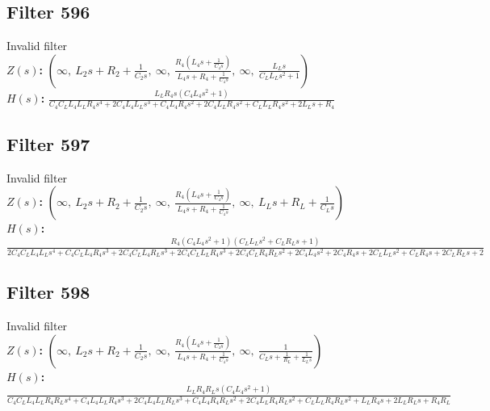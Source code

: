 \documentclass{article}
\begin{document}
\subsection*{Filter 596}
Invalid filter \\ 
\textbf{$Z(s)$:} $\left( \infty, \  L_{2} s + R_{2} + \frac{1}{C_{2} s}, \  \infty, \  \frac{R_{4} \left(L_{4} s + \frac{1}{C_{4} s}\right)}{L_{4} s + R_{4} + \frac{1}{C_{4} s}}, \  \infty, \  \frac{L_{L} s}{C_{L} L_{L} s^{2} + 1}\right)$ \\ 
\textbf{$H(s)$:} $\frac{L_{L} R_{4} s \left(C_{4} L_{4} s^{2} + 1\right)}{C_{4} C_{L} L_{4} L_{L} R_{4} s^{4} + 2 C_{4} L_{4} L_{L} s^{3} + C_{4} L_{4} R_{4} s^{2} + 2 C_{4} L_{L} R_{4} s^{2} + C_{L} L_{L} R_{4} s^{2} + 2 L_{L} s + R_{4}}$ \\ 
\subsection*{Filter 597}
Invalid filter \\ 
\textbf{$Z(s)$:} $\left( \infty, \  L_{2} s + R_{2} + \frac{1}{C_{2} s}, \  \infty, \  \frac{R_{4} \left(L_{4} s + \frac{1}{C_{4} s}\right)}{L_{4} s + R_{4} + \frac{1}{C_{4} s}}, \  \infty, \  L_{L} s + R_{L} + \frac{1}{C_{L} s}\right)$ \\ 
\textbf{$H(s)$:} $\frac{R_{4} \left(C_{4} L_{4} s^{2} + 1\right) \left(C_{L} L_{L} s^{2} + C_{L} R_{L} s + 1\right)}{2 C_{4} C_{L} L_{4} L_{L} s^{4} + C_{4} C_{L} L_{4} R_{4} s^{3} + 2 C_{4} C_{L} L_{4} R_{L} s^{3} + 2 C_{4} C_{L} L_{L} R_{4} s^{3} + 2 C_{4} C_{L} R_{4} R_{L} s^{2} + 2 C_{4} L_{4} s^{2} + 2 C_{4} R_{4} s + 2 C_{L} L_{L} s^{2} + C_{L} R_{4} s + 2 C_{L} R_{L} s + 2}$ \\ 
\subsection*{Filter 598}
Invalid filter \\ 
\textbf{$Z(s)$:} $\left( \infty, \  L_{2} s + R_{2} + \frac{1}{C_{2} s}, \  \infty, \  \frac{R_{4} \left(L_{4} s + \frac{1}{C_{4} s}\right)}{L_{4} s + R_{4} + \frac{1}{C_{4} s}}, \  \infty, \  \frac{1}{C_{L} s + \frac{1}{R_{L}} + \frac{1}{L_{L} s}}\right)$ \\ 
\textbf{$H(s)$:} $\frac{L_{L} R_{4} R_{L} s \left(C_{4} L_{4} s^{2} + 1\right)}{C_{4} C_{L} L_{4} L_{L} R_{4} R_{L} s^{4} + C_{4} L_{4} L_{L} R_{4} s^{3} + 2 C_{4} L_{4} L_{L} R_{L} s^{3} + C_{4} L_{4} R_{4} R_{L} s^{2} + 2 C_{4} L_{L} R_{4} R_{L} s^{2} + C_{L} L_{L} R_{4} R_{L} s^{2} + L_{L} R_{4} s + 2 L_{L} R_{L} s + R_{4} R_{L}}$ \\ 
\end{document}
